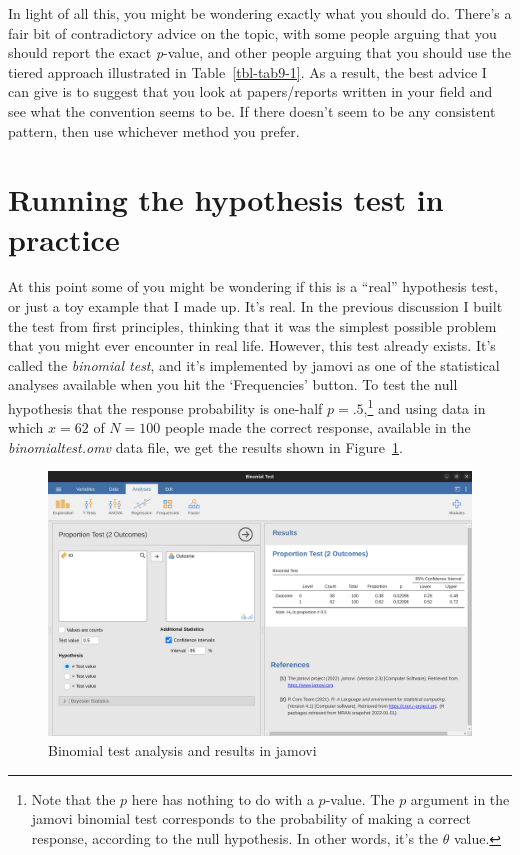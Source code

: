 \documentclass[
  a4paper,
]{book}
\begin{document}
In light of all this, you might be wondering exactly what you should do.
There's a fair bit of contradictory advice on the topic, with some
people arguing that you should report the exact \emph{p}-value, and
other people arguing that you should use the tiered approach illustrated
in Table~\ref{tbl-tab9-1}. As a result, the best advice I can give is to
suggest that you look at papers/reports written in your field and see
what the convention seems to be. If there doesn't seem to be any
consistent pattern, then use whichever method you prefer.

\hypertarget{running-the-hypothesis-test-in-practice}{%
\section{Running the hypothesis test in
practice}\label{running-the-hypothesis-test-in-practice}}

At this point some of you might be wondering if this is a ``real''
hypothesis test, or just a toy example that I made up. It's real. In the
previous discussion I built the test from first principles, thinking
that it was the simplest possible problem that you might ever encounter
in real life. However, this test already exists. It's called the
\emph{binomial test}, and it's implemented by jamovi as one of the
statistical analyses available when you hit the `Frequencies' button. To
test the null hypothesis that the response probability is one-half
\(p = .5\),\footnote{Note that the \(p\) here has nothing to do with a
  \(p\)-value. The \(p\) argument in the jamovi binomial test
  corresponds to the probability of making a correct response, according
  to the null hypothesis. In other words, it's the \(\theta\) value.}
and using data in which \(x =62\) of \(N = 100\) people made the correct
response, available in the \emph{binomialtest.omv} data file, we get the
results shown in Figure~\ref{fig-fig9-4}.

\begin{figure}

\includegraphics[width=1\textwidth,height=\textheight]{images/fig9-4.png} \hfill{}

\caption{\label{fig-fig9-4}Binomial test analysis and results in jamovi}

\end{figure}
\end{document}
